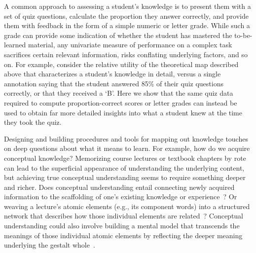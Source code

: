 \documentclass[10pt]{article}
\begin{document}
A common approach to assessing a student's knowledge is to present them with a
set of quiz questions, calculate the proportion they answer correctly, and
provide them with feedback in the form of a simple numeric or letter grade.
While such a grade can provide some indication of whether the student
has mastered the to-be-learned material, any univariate measure of performance
on a complex task sacrifices certain relevant information, risks conflating
underlying factors, and so on. For example, consider the relative utility of
the theoretical map described above that characterizes a student's knowledge in
detail, versus a single annotation saying that the student answered 85\% of
their quiz questions correctly, or that they received a `B'. Here we show that
the same quiz data required to compute proportion-correct scores or letter
grades can instead be used to obtain far more detailed insights into what a
student knew at the time they took the quiz.

Designing and building procedures and tools for mapping out knowledge touches
on deep questions about what it means to learn. For example, how do we acquire
conceptual knowledge? Memorizing course lectures or textbook chapters by rote
can lead to the superficial appearance of understanding the underlying
content, but achieving true conceptual understanding seems to require something
deeper and richer. Does conceptual understanding entail connecting newly
acquired information to the scaffolding of one's existing knowledge or
experience~\citep{BlayEtal06,CaraMaho03, ConsEtal16, DeacEtal04, SimoEtal04,
HuebWill18}? Or weaving a lecture's atomic elements (e.g., its component words)
into a structured network that describes how those individual elements are
related~\citep{LeeChen22, vanPEtal21}? Conceptual understanding could also
involve building a mental model that transcends the meanings of those
individual atomic elements by reflecting the deeper meaning underlying the
gestalt whole~\citep{Kint70, Macl05, ScotEtal07, TulcEtal23}.
\end{document}
